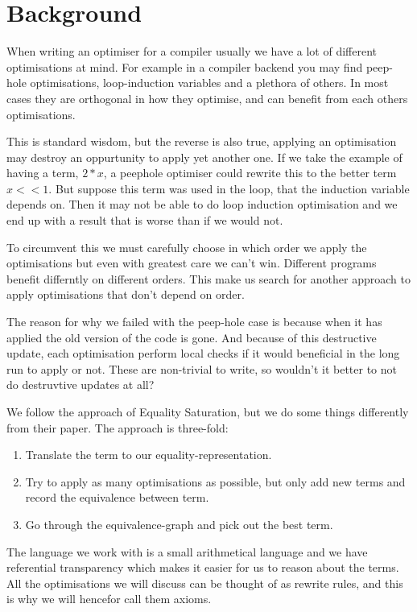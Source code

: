 
\section{Background}
When writing an optimiser for a compiler usually we have a lot of different 
optimisations at mind. For example in a compiler backend you may find peep-hole\cite{peephole}
optimisations, loop-induction variables\cite{loop-induction} and a plethora of others. In most cases 
they are orthogonal in how they optimise, and can benefit from each others optimisations.

This is standard wisdom, but the reverse is also true, applying an optimisation
may destroy an oppurtunity to apply yet another one. If we take the example of having a 
term, $ 2 * x $, a peephole optimiser could rewrite this to the better term 
$ x << 1$. But suppose this term was used in the loop, that the induction variable
depends on. Then it may not be able to do loop induction optimisation and we end up
with a result that is worse than if we would not.

To circumvent this we must carefully choose in which order we apply the optimisations
but even with greatest care we can't win. Different programs benefit differntly
on different orders. This make us search for another approach to apply optimisations
that don't depend on order. 

The reason for why we failed with the peep-hole case is because when it has applied
the old version of the code is gone. And because of this destructive update, each
optimisation perform local checks if it would beneficial in the long run to apply
or not. These are non-trivial to write, so wouldn't it better to not do destruvtive
updates at all?

We follow the approach of Equality Saturation\cite{eqSat}, but we do some things
differently from their paper. The approach is three-fold:

\begin{enumerate}
  \item Translate the term to our equality-representation.
  \item Try to apply as many optimisations as possible, but only add new terms and
        record the equivalence between term.
  \item Go through the equivalence-graph and pick out the best term.
\end{enumerate}

The language we work with is a small arithmetical language and we have referential
transparency which makes it easier for us to reason about the terms. All the optimisations
we will discuss can be thought of as rewrite rules, and this is why we will hencefor
call them axioms.


